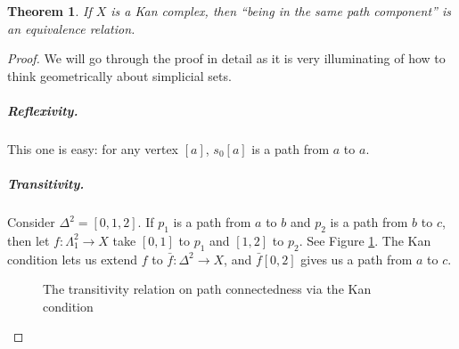 \documentclass[12pt]{article}
\theoremstyle{plain}
\newtheorem{theorem}{Theorem}[section]
\theoremstyle{definition}
\theoremstyle{remark}
\begin{document}
\begin{theorem}
If $X$ is a Kan complex, then ``being in the same path component'' is an equivalence relation.
\end{theorem}
\begin{proof}
We will go through the proof in detail as it is very illuminating of how to think geometrically about simplicial sets.

\subparagraph{Reflexivity.} This one is easy: for any vertex $[a]$, $s_0[a]$ is a path from $a$ to $a$. 


\subparagraph{Transitivity.} Consider $\Delta^2=[0,1,2]$. If $p_1$ is a path from $a$ to $b$ and $p_2$ is a path from $b$ to $c$, then let $f\colon\Lambda_1^2\to X$ take $[0,1]$ to $p_1$ and $[1,2]$ to $p_2$. See Figure \ref{F: fig20a}. The Kan condition lets us extend $f$ to $\bar f\colon\Delta^2 \to X$, and $\bar f[0,2]$ gives us a path from $a$ to $c$.  

\begin{figure}[!htp]
\begin{center}
\end{center}
\caption{The transitivity relation on path connectedness via the Kan condition}\label{F: fig20a}
\end{figure}


\end{proof}
\end{document}
